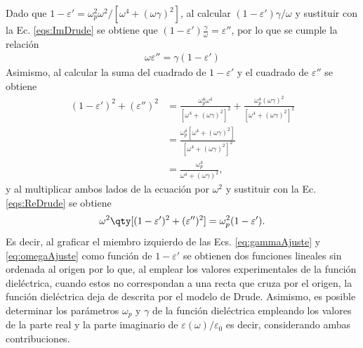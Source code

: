 Dado que $1-\varepsilon' = \omega_p^2\omega^2 / [\omega^4 + (\omega\gamma)^2]$, al calcular  $(1-\varepsilon')\gamma/\omega$ y sustituir con la Ec. \eqref{eqs:ImDrude} se obtiene que $	( 1-\varepsilon') \frac{\gamma}{\omega} =\varepsilon''$, por lo que se cumple la relación
	\begin{align}
	\omega\varepsilon''= \gamma( 1-\varepsilon') \label{eq:gammaAjuste}
	\end{align}
Asimismo, al calcular la suma del cuadrado de $1-\varepsilon'$ y el cuadrado de $\varepsilon''$ se obtiene
	\begin{align*}
	( 1-\varepsilon') ^2 + (\varepsilon'')^2 
					&=\frac{\omega_p^4 \omega^4}{[\omega^4 + (\omega\gamma)^2]^2}+
									\frac{\omega_p^4 (\omega\gamma)^2}{[\omega^4 + (\omega\gamma)^2]^2}\\
					&= \frac{\omega_p^4[\omega^4 + (\omega\gamma)^2]}{[\omega^4 + (\omega\gamma)^2]^2}\\
					&= \frac{\omega_p^4}{\omega^4 + (\omega\gamma)^2},
		\end{align*}
y al multiplicar ambos lados de la ecuación por $\omega^2$	 y sustituir con la Ec. \eqref{eqs:ReDrude} se obtiene
	\begin{align}
	\omega^2\qty[( 1-\varepsilon') ^2 + (\varepsilon'')^2 ]  
						= \omega_p^2( 1-\varepsilon').
	\label{eq:omegaAjuste}
	\end{align}
Es decir, al graficar el miembro izquierdo de las Ecs. \eqref{eq:gammaAjuste} y \eqref{eq:omegaAjuste} como función de $ 1-\varepsilon'$ se obtienen dos funciones lineales sin ordenada al origen por lo que, al emplear los valores experimentales de la función dieléctrica, cuando estos no correspondan a una recta que cruza por el origen, la función dieléctrica deja de descrita por el modelo de Drude. Asimismo, es posible determinar los parámetros $\omega_p$ y $\gamma$ de la función dieléctrica empleando los valores de la parte real y la parte imaginario de $\varepsilon(\omega)/\varepsilon_0$ es decir, considerando ambas contribuciones.

